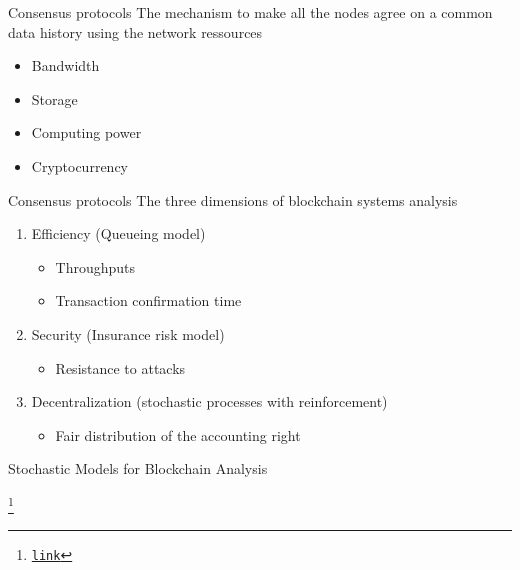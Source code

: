 \documentclass{beamer}
\newcommand\blfootnote[1]{%
  \begingroup
  \renewcommand\thefootnote{}\footnote{#1}%
  \addtocounter{footnote}{-1}%
  \endgroup
}
\begin{document}
\begin{frame}{Consensus protocols}
The mechanism to make all the nodes agree on a common data history using the network ressources
\vspace{0.3cm}
\begin{itemize}
  \item Bandwidth
  \item Storage
  \item Computing power
  \item Cryptocurrency
\end{itemize}
\end{frame}
\begin{frame}{Consensus protocols}
The three dimensions of blockchain systems analysis
\begin{enumerate}
  \item Efficiency (Queueing model)
  \begin{itemize}
    \item Throughputs
    \item Transaction confirmation time
  \end{itemize}
    \item Security (Insurance risk model)
  \begin{itemize}
    \item Resistance to attacks
  \end{itemize}
  \item Decentralization (stochastic processes with reinforcement)
  \begin{itemize}
    \item Fair distribution of the accounting right
  \end{itemize}

\end{enumerate}
\begin{tcolorbox}[enhanced,drop shadow, title=BLOCKASTICS project]
Stochastic Models for Blockchain Analysis
\end{tcolorbox}
\blfootnote{ 
\href{https://pierre-olivier.goffard.me/BLOCKASTICS/}{\texttt{link}}}
\end{frame}
\end{document}
